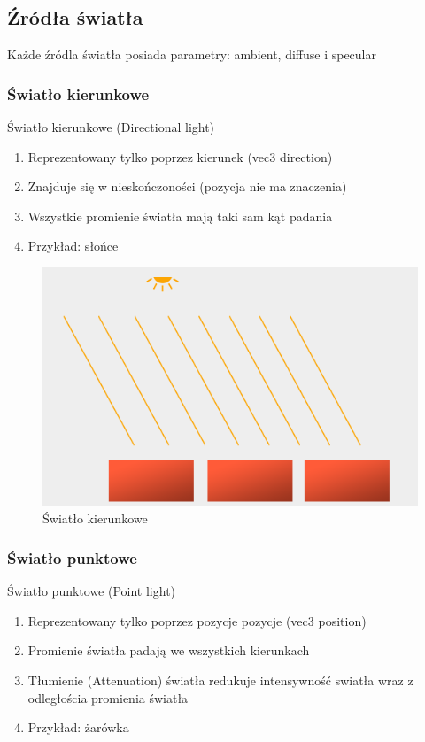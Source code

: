 \documentclass[12pt]{article}
\begin{document}
\subsection{Źródła światła}
Każde źródla światła posiada parametry: ambient, diffuse i specular

\subsubsection{Światło kierunkowe}
Światło kierunkowe (Directional light)
\begin{enumerate}
\item Reprezentowany tylko poprzez kierunek (vec3 direction)
\item Znajduje się w nieskończoności (pozycja nie ma znaczenia)
\item Wszystkie promienie światła mają taki sam kąt padania
\item Przykład: słońce
\end{enumerate}

\begin{figure}[H]
	\centering
	\includegraphics[scale=0.5]{Pictures/directional_light.png}
	\caption{Światło kierunkowe}
\end{figure}

\subsubsection{Światło punktowe}
Światło punktowe (Point light)
\begin{enumerate}
\item Reprezentowany tylko poprzez pozycje pozycje (vec3 position)
\item Promienie światła padają we wszystkich kierunkach
\item Tłumienie (Attenuation) światła redukuje intensywność swiatła wraz z odległościa promienia światła
\item Przykład: żarówka
\end{enumerate}
\end{document}
